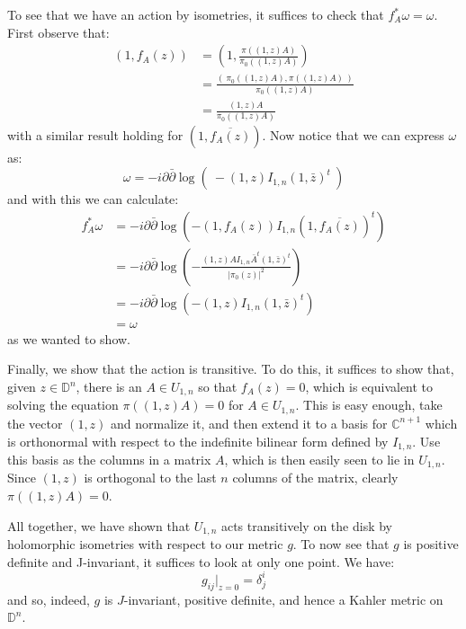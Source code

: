 \documentclass[11pt]{amsart}
\theoremstyle{definition}
\def \C{ \mathbb{C} }
\def \del{ \partial }
\def \delbar{ \bar{\partial} }
\def \disk{ \mathbb{D} }
\begin{document}
To see that we have an action by isometries, it suffices to check that $f_A^{\ast} \omega = \omega$.  First observe that:
%
\begin{align*}
(1, f_A(z) ) &= \left( 1, \frac{ \pi( (1,z)A ) }{ \pi_0 ( (1,z)A ) } \right) \\
&= \frac{ ( \ \pi_0 ( (1,z)A ), \pi ( (1,z)A ) \ ) }{ \pi_0( (1,z)A ) } \\
&= \frac{ (1,z)A }{ \pi_0 ( (1,z)A ) }
\end{align*}
%
with a similar result holding for $( 1, \overline{ f_A (z) } )$.  Now notice that we can express $\omega$ as:
%
$$ \omega = -i \del \delbar \log( \ - (1,z) I_{1,n} (1, \bar{z})^{t} \ ) $$
%
and with this we can calculate:
%
\begin{align*}
f_A^{\ast} \omega &= - i \del \delbar \log ( - (1, f_A (z) ) I_{1,n} (1, \overline{ f_A (z) } )^{t} ) \\
&= -i \del \delbar \log \left( - \frac{ (1,z)A I_{1,n} \bar{A}^{t} (1, \bar{z})^{t} }{ | \pi_0 (z) |^2 } \right) \\
&= - i \del \delbar \log ( - (1,z) I_{1,n} (1, \bar{z})^{t} ) \\
&= \omega
\end{align*}
%
as we wanted to show.

Finally, we show that the action is transitive.  To do this, it suffices to show that, given $z \in \disk^n$, there is an $A \in U_{1,n}$ so that $f_A (z) = 0$, which is equivalent to solving the equation $\pi( (1,z)A ) = 0$ for $A \in U_{1,n}$.  This is easy enough, take the vector $(1,z)$ and normalize it, and then extend it to a basis for $\C^{n+1}$ which is orthonormal with respect to the indefinite bilinear form defined by $I_{1,n}$.  Use this basis as the columns in a matrix $A$, which is then easily seen to lie in $U_{1,n}$.  Since $(1,z)$ is orthogonal to the last $n$ columns of the matrix, clearly $\pi ( (1,z)A ) = 0$.

All together, we have shown that $U_{1,n}$ acts transitively on the disk by holomorphic isometries with respect to our metric $g$.  To now see that $g$ is positive definite and J-invariant, it suffices to look at only one point.  We have:
%
$$ g_{ij}|_{z=0} = \delta^i_j$$
%
and so, indeed, $g$ is $J$-invariant, positive definite, and hence a Kahler metric on $\disk^n$.
\end{document}

